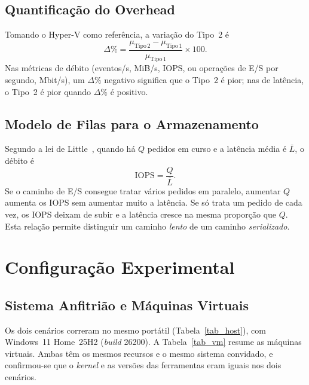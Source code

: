 \documentclass[conference]{IEEEtran}
\begin{document}
\subsection{Quantificação do Overhead}\label{sec_delta}
Tomando o Hyper-V como referência, a variação do Tipo~2 é
\begin{equation}
\Delta\% = \frac{\mu_{\mathrm{Tipo\,2}}-\mu_{\mathrm{Tipo\,1}}}{\mu_{\mathrm{Tipo\,1}}}\times 100 .
\label{eq_delta}
\end{equation}
Nas métricas de débito (eventos/s, MiB/s, IOPS, ou operações de E/S por segundo, Mbit/s), um $\Delta\%$ negativo significa que o Tipo~2 é pior; nas de latência, o Tipo~2 é pior quando $\Delta\%$ é positivo.

\subsection{Modelo de Filas para o Armazenamento}
Segundo a lei de Little~\cite{b14}, quando há $Q$ pedidos em curso e a latência média é $\bar{L}$, o débito é
\begin{equation}
\mathrm{IOPS} = \frac{Q}{\bar{L}} .
\label{eq_little}
\end{equation}
Se o caminho de E/S consegue tratar vários pedidos em paralelo, aumentar $Q$ aumenta os IOPS sem aumentar muito a latência. Se só trata um pedido de cada vez, os IOPS deixam de subir e a latência cresce na mesma proporção que $Q$. Esta relação permite distinguir um caminho \textit{lento} de um caminho \textit{serializado}.

\section{Configuração Experimental}\label{sec_conf}

\subsection{Sistema Anfitrião e Máquinas Virtuais}
Os dois cenários correram no mesmo portátil (Tabela~\ref{tab_host}), com Windows~11 Home~25H2 (\textit{build} 26200). A Tabela~\ref{tab_vm} resume as máquinas virtuais. Ambas têm os mesmos recursos e o mesmo sistema convidado, e confirmou-se que o \textit{kernel} e as versões das ferramentas eram iguais nos dois cenários.
\end{document}
